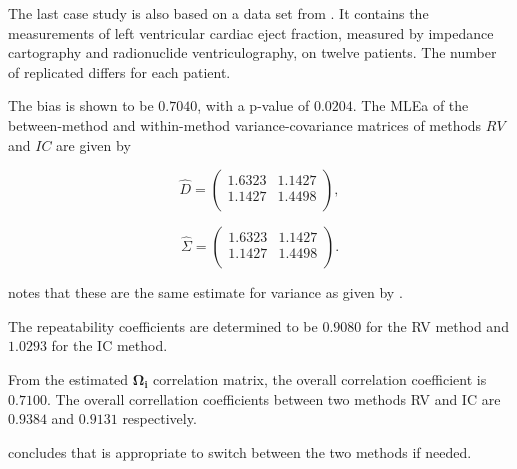 \documentclass[12pt, a4paper]{article}
\theoremstyle{plain}
\theoremstyle{definition}
\theoremstyle{remark}
\begin{document}
The last case study is also based on a data set from  \citet{BA99}. It contains the measurements of left ventricular cardiac eject fraction, measured by impedance cartography and radionuclide ventriculography, on twelve patients.
The number of replicated differs for each patient.

The bias is shown to be $0.7040$, with a p-value of $0.0204$. The MLEa of the between-method and within-method variance-covariance matrices of methods $RV$ and $IC$ are given by

\begin{equation}\hat{D}=\left(
                                      \begin{array}{cc}
                                        1.6323 & 1.1427 \\
                                        1.1427 & 1.4498 \\
                                      \end{array}
                                    \right),
\end{equation}



\begin{equation}\hat{\Sigma}=\left(
                                      \begin{array}{cc}
                                        1.6323 & 1.1427 \\
                                        1.1427 & 1.4498 \\
                                      \end{array}
                                    \right).
\end{equation}

\citet{roy} notes that these are the same estimate for variance as given by \citet{BA99}.


The repeatability coefficients are determined to be $0.9080$ for the RV method and $1.0293$ for the IC method.

From the estimated $\boldsymbol{\Omega_{i}}$ correlation matrix, the overall correlation coefficient is $0.7100$.
The overall correllation coefficients between two methods RV and IC are $0.9384$ and $0.9131$ respectively.

\citet{roy} concludes that is appropriate to switch between the two methods if needed.

\end{document}
